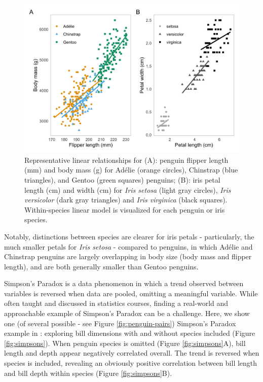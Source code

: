 \begin{Schunk}
\begin{figure}[htbp]

{\centering \includegraphics[width=\textwidth]{figs/linear-example-1} 

}

\caption[Representative linear relationships for (A)]{Representative linear relationships for (A): penguin flipper length (mm) and body mass (g) for Adélie (orange circles), Chinstrap (blue triangles), and Gentoo (green squares) penguins; (B): iris petal length (cm) and width (cm) for \textit{Iris setosa} (light gray circles), \textit{Iris versicolor} (dark gray triangles) and \textit{Iris virginica} (black squares). Within-species linear model is visualized for each penguin or iris species.}\label{fig:linear-example}
\end{figure}
\end{Schunk}

Notably, distinctions between species are clearer for iris petals -
particularly, the much smaller petals for \emph{Iris setosa} - compared
to penguins, in which Adélie and Chinstrap penguins are largely
overlapping in body size (body mass and flipper length), and are both
generally smaller than Gentoo penguins.

Simpson's Paradox is a data phenomenon in which a trend observed between
variables is reversed when data are pooled, omitting a meaningful
variable. While often taught and discussed in statistics courses,
finding a real-world and approachable example of Simpson's Paradox can
be a challenge. Here, we show one (of several possible - see Figure
\ref{fig:penguin-pairs}) Simpson's Paradox example in :
exploring bill dimensions with and without species included (Figure
\ref{fig:simpsons}). When penguin species is omitted (Figure
\ref{fig:simpsons}A), bill length and depth appear negatively correlated
overall. The trend is reversed when species is included, revealing an
obviously positive correlation between bill length and bill depth within
species (Figure \ref{fig:simpsons}B).

